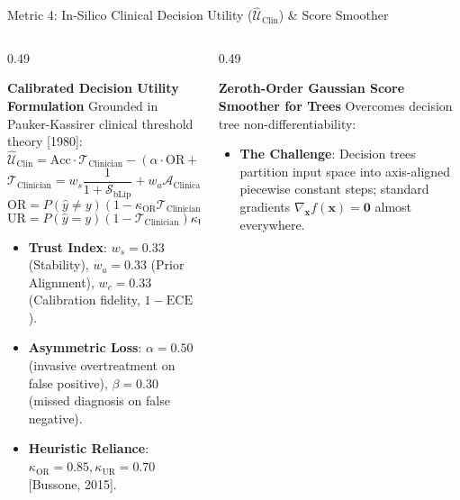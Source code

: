 \documentclass[aspectratio=169,10pt]{beamer}
\begin{document}
\begin{frame}{Metric 4: In-Silico Clinical Decision Utility ($\widehat{\mathcal{U}}_{\text{Clin}}$) \& Score Smoother}
  \vspace{-0.1cm}
  \begin{columns}[t]
    \begin{column}{0.49\textwidth}
      \begin{block}{\textbf{Calibrated Decision Utility Formulation}}
        \scriptsize
        Grounded in Pauker-Kassirer clinical threshold theory [1980]:
        $$\widehat{\mathcal{U}}_{\text{Clin}} = \text{Acc} \cdot \mathcal{T}_{\text{Clinician}} - (\alpha \cdot \text{OR} + \beta \cdot \text{UR})$$
        $$\mathcal{T}_{\text{Clinician}} = w_s \frac{1}{1 + \mathcal{S}_{\text{bLip}}} + w_a \mathcal{A}_{\text{Clinical}} + w_c (1 - \text{ECE})$$
        $$\text{OR} = P(\hat{y} \ne y)(1 - \kappa_{\text{OR}} \mathcal{T}_{\text{Clinician}})$$
        $$\text{UR} = P(\hat{y} = y)(1 - \mathcal{T}_{\text{Clinician}})\kappa_{\text{UR}}$$
        \vspace{1pt}
        \begin{itemize}\setlength\itemsep{1.5pt}
          \item \textbf{Trust Index}: $w_s=0.33$ (Stability), $w_a=0.33$ (Prior Alignment), $w_c=0.33$ (Calibration fidelity, $1-\text{ECE}$).
          \item \textbf{Asymmetric Loss}: $\alpha = 0.50$ (invasive overtreatment on false positive), $\beta = 0.30$ (missed diagnosis on false negative).
          \item \textbf{Heuristic Reliance}: $\kappa_{\text{OR}} = 0.85, \kappa_{\text{UR}} = 0.70$ [Bussone, 2015].
        \end{itemize}
      \end{block}
    \end{column}
    \begin{column}{0.49\textwidth}
      \begin{exampleblock}{\textbf{Zeroth-Order Gaussian Score Smoother for Trees}}
        \scriptsize
        Overcomes decision tree non-differentiability:
        \vspace{1pt}
        \begin{itemize}\setlength\itemsep{2pt}
          \item \textbf{The Challenge}: Decision trees partition input space into axis-aligned piecewise constant steps; standard gradients $\nabla_\mathbf{x} f(\mathbf{x}) = \mathbf{0}$ almost everywhere.

\end{itemize}
\end{exampleblock}
\end{column}
\end{columns}
\end{frame}
\end{document}
